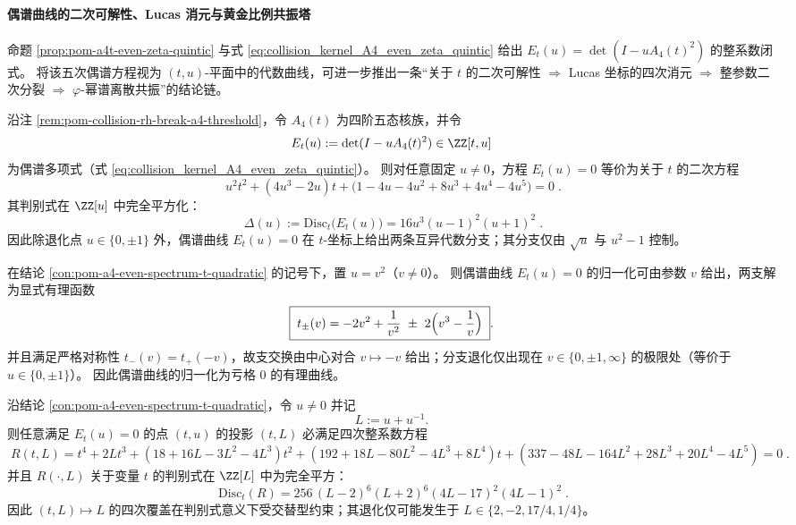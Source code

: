 %
\paragraph{偶谱曲线的二次可解性、Lucas 消元与黄金比例共振塔}
命题 \ref{prop:pom-a4t-even-zeta-quintic} 与式 \eqref{eq:collision_kernel_A4_even_zeta_quintic} 给出 \(E_t(u)=\det(I-uA_4(t)^2)\) 的整系数闭式。
将该五次偶谱方程视为 \((t,u)\)-平面中的代数曲线，可进一步推出一条“关于 \(t\) 的二次可解性 \(\Rightarrow\) Lucas 坐标的四次消元 \(\Rightarrow\) 整参数二次分裂 \(\Rightarrow\) \(\varphi\)-幂谱离散共振”的结论链。

\begin{conclusion}\label{con:pom-a4-even-spectrum-t-quadratic}
沿注 \ref{rem:pom-collision-rh-break-a4-threshold}，令 \(A_4(t)\) 为四阶五态核族，并令
\[
E_t(u):=\det(I-uA_4(t)^2)\in\ZZ[t,u]
\]
为偶谱多项式（式 \eqref{eq:collision_kernel_A4_even_zeta_quintic}）。
则对任意固定 \(u\neq 0\)，方程 \(E_t(u)=0\) 等价为关于 \(t\) 的二次方程
\[
\boxed{\;
u^2 t^2+(4u^3-2u)t+\bigl(1-4u-4u^2+8u^3+4u^4-4u^5\bigr)=0\; } .
\]
其判别式在 \(\ZZ[u]\) 中完全平方化：
\[
\boxed{\;
\Delta(u):=\mathrm{Disc}_t\!\bigl(E_t(u)\bigr)
=16u^3(u-1)^2(u+1)^2\; } .
\]
因此除退化点 \(u\in\{0,\pm1\}\) 外，偶谱曲线 \(E_t(u)=0\) 在 \(t\)-坐标上给出两条互异代数分支；其分支仅由 \(\sqrt u\) 与 \(u^2-1\) 控制。
\end{conclusion}

\begin{conclusion}[全局有理参数化：\texorpdfstring{$u=v^2$}{u=v^2} 归一化与支交换对合]\label{con:pom-a4-even-spectrum-rational-param}
在结论 \ref{con:pom-a4-even-spectrum-t-quadratic} 的记号下，置 \(u=v^2\)（\(v\neq 0\)）。
则偶谱曲线 \(E_t(u)=0\) 的归一化可由参数 \(v\) 给出，两支解为显式有理函数
\[
\boxed{\;
t_{\pm}(v)= -2v^2+\frac{1}{v^2}\ \pm\ 2\Bigl(v^3-\frac{1}{v}\Bigr)\; } .
\]
并且满足严格对称性 \(t_{-}(v)=t_{+}(-v)\)，故支交换由中心对合 \(v\mapsto -v\) 给出；分支退化仅出现在 \(v\in\{0,\pm1,\infty\}\) 的极限处（等价于 \(u\in\{0,\pm1\}\)）。
因此偶谱曲线的归一化为亏格 \(0\) 的有理曲线。
\end{conclusion}

\begin{conclusion}\label{con:pom-a4-even-spectrum-lucas-elimination}
沿结论 \ref{con:pom-a4-even-spectrum-t-quadratic}，令 \(u\neq 0\) 并记
\[
L:=u+u^{-1}.
\]
则任意满足 \(E_t(u)=0\) 的点 \((t,u)\) 的投影 \((t,L)\) 必满足四次整系数方程
\[
\boxed{\;
R(t,L)=t^4+2Lt^3+(18+16L-3L^2-4L^3)t^2+(192+18L-80L^2-4L^3+8L^4)t
+(337-48L-164L^2+28L^3+20L^4-4L^5)=0\; } .
\]
并且 \(R(\cdot,L)\) 关于变量 \(t\) 的判别式在 \(\ZZ[L]\) 中为完全平方：
\[
\boxed{\;
\mathrm{Disc}_t(R)=256\,(L-2)^6(L+2)^6(4L-17)^2(4L-1)^2\; } .
\]
因此 \((t,L)\mapsto L\) 的四次覆盖在判别式意义下受交替型约束；其退化仅可能发生于
\(
L\in\{2,-2,17/4,1/4\}
\)。
\end{conclusion}

